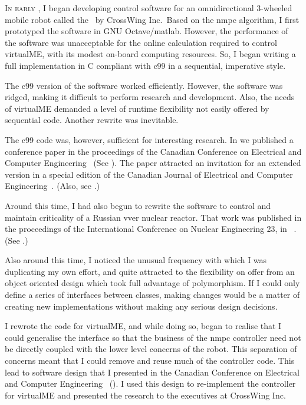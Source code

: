 \textsc{In early} , I began developing control software for an
omnidirectional 3-wheeled mobile robot called the \virtualmeR\ by CrossWing
Inc.\ Based on the \ac{nmpc} algorithm, I first prototyped the software in GNU
Octave/\acs{matlab}. However, the performance of the software was unacceptable
for the online calculation required to control virtualME, with its modest
on-board computing resources. So, I began writing a full implementation in C
compliant with \acf{c99} in a sequential, imperative style.

The \ac{c99} version of the software worked efficiently. However, the software
was ridged, making it
difficult to perform research and development. Also, the needs of virtualME
demanded a level of runtime flexibility not easily offered by sequential code.
Another rewrite was inevitable.

The \ac{c99} code was, however, sufficient for interesting research. In
 we published a conference paper in the proceedings of the Canadian
Conference on Electrical and Computer Engineering~\cite{Teatro2013} (See
). The paper attracted an invitation for an extended
version in a special edition of the Canadian Journal of Electrical and Computer
Engineering~\cite{Teatro2014}. (Also, see .)

Around this time, I had also begun to rewrite the software to control and
maintain criticality of a Russian \ac{vver} nuclear reactor. That work was
published in the proceedings of the International Conference on Nuclear
Engineering 23, in ~\cite{Teatro2015}. (See
.)

Also around this time, I noticed the unusual frequency with which I was
duplicating my own effort, and quite attracted to the flexibility on offer from
an object oriented design which took full advantage of polymorphism. If I could
only define a series of interfaces between classes, making changes would be a
matter of creating new implementations without making any serious design
decisions.

I rewrote the code for virtualME, and while doing so, began to realise that I
could generalise the interface so that the business of the \ac{nmpc} controller
need not be directly coupled with the lower level concerns of the robot. This
separation of concerns meant that I could remove and reuse much of the
controller code. This lead to software design that I presented in the
 Canadian Conference on Electrical and Computer
Engineering~\cite{Teatro2016} (). I used this design to
re-implement the controller for virtualME and presented the research to the
executives at CrossWing Inc.


